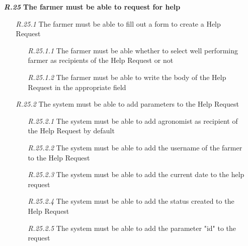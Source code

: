 \begin{itemize}
        \item [\textbf{\textit{R.25}}]\textbf{ The farmer must be able to request for help }
        \begin{itemize}
            \item [\textit{R.25.1}] The farmer must be able to fill out a form to create a Help Request
            \begin{itemize}
                \item [\textit{R.25.1.1}] The farmer must be able whether to select well performing farmer as recipients of the Help Request or not
		        \item [\textit{R.25.1.2}] The farmer must be able to write the body of the Help Request in the appropriate field
            \end{itemize}
            \item [\textit{R.25.2}] The system must be able to add parameters to the Help Request
            \begin{itemize}
                \item [\textit{R.25.2.1}] The system must be able to add agronomist as recipient of the Help Request by default
		        \item [\textit{R.25.2.2}] The system must be able to add the username of the farmer to the Help Request
		        \item [\textit{R.25.2.3}] The system must be able to add the current date to the help request
		        \item [\textit{R.25.2.4}] The system must be able to add the status created to the Help Request
		        \item [\textit{R.25.2.5}] The system must be able to add the parameter "id" to the request

            \end{itemize}
        \end{itemize}
        	

\end{itemize}
